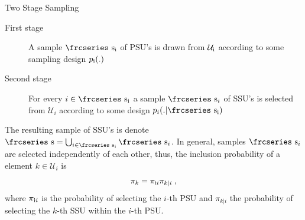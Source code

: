 \documentclass{beamer}\usepackage[]{graphicx}\usepackage[]{color}
\newcommand{\textfrc}[1]{{\frcseries#1}}
\newcommand{\mathfrc}[1]{\text{\textfrc{#1}}}
\newcommand{\RN}[1]{%
  \textup{\uppercase\expandafter{\romannumeral#1}}%
}
\begin{document}
\begin{frame}{Two Stage Sampling}
 \begin{description}
 \item[First  stage] A sample $\mathfrc{s}_{\RN{1}}$ of PSU's is drawn from $\mathcal{U}_{\RN{1}}$ according to some sampling design $p_{\RN{1}}(.)$
 \item[Second stage] For every $i \in \mathfrc{s}_{\RN{1}}$ a sample $\mathfrc{s}_i$ of SSU's is selected from $\mathcal{U}_i$ according to some design $p_i(.|\mathfrc{s}_{\RN{1}})$
 \end{description}
 The resulting sample of SSU's is denote $\mathfrc{s}= \bigcup_{i \in \mathfrc{s}_{\RN{1}}} \mathfrc{s}_i $.
 In general, samples $\mathfrc{s}_i$ are selected independently of each other, thus, the inclusion probability of a element $k \in \mathcal{U}_i$ is
$$\pi_k=\pi_{\RN{1}i}\pi_{k|i}\;,$$
where $\pi_{\RN{1}i}$ is the probability of selecting the $i$-th PSU and $\pi_{k|i}$  the probability of selecting
the $k$-th SSU within the $i$-th PSU.
\end{frame}
\end{document}
